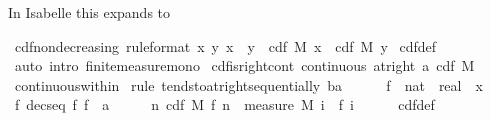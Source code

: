 \documentclass{article}
\theoremstyle{definition}
\begin{document}
In Isabelle this expands to

\medskip

\begin{isabellebody}
\isamarkupfalse%
\ cdf{\isacharunderscore}nondecreasing\ {\isacharbrackleft}rule{\isacharunderscore}format{\isacharbrackright}{\isacharcolon}\ {\isachardoublequoteopen}{\isacharparenleft}{\isasymforall}x\ y{\isachardot}\ x\ {\isasymle}\ y\ {\isasymlongrightarrow}\ cdf\ M\ x\ {\isasymle}\ cdf\ M\ y{\isacharparenright}{\isachardoublequoteclose}\isanewline
{}\isamarkupfalse%
\ cdf{\isacharunderscore}def\ \isamarkupfalse%
\ {\isacharparenleft}auto\ intro{\isacharbang}{\isacharcolon}\ finite{\isacharunderscore}measure{\isacharunderscore}mono{\isacharparenright}%
\isanewline\isanewline%
\isamarkupfalse%
\ cdf{\isacharunderscore}is{\isacharunderscore}right{\isacharunderscore}cont{\isacharcolon}\ {\isachardoublequoteopen}continuous\ {\isacharparenleft}at{\isacharunderscore}right\ a{\isacharparenright}\ {\isacharparenleft}cdf\ M{\isacharparenright}{\isachardoublequoteclose}\isanewline
{}\isamarkupfalse%
\ continuous{\isacharunderscore}within\isanewline
{}\isamarkupfalse%
\ {\isacharparenleft}rule\ tendsto{\isacharunderscore}at{\isacharunderscore}right{\isacharunderscore}sequentially{\isacharbrackleft}\ b{\isacharequal}{\isachardoublequoteopen}a\ {\isacharplus}\ {}{\isachardoublequoteclose}{\isacharbrackright}{\isacharparenright}\isanewline
\ \ \isamarkupfalse%
\ f\ {\isacharcolon}{\isacharcolon}\ {\isachardoublequoteopen}nat\ {\isasymRightarrow}\ real{\isachardoublequoteclose}\ \ x\ \isamarkupfalse%
\ f{\isacharcolon}\ {\isachardoublequoteopen}decseq\ f{\isachardoublequoteclose}\ {\isachardoublequoteopen}f\ {\isacharminus}{\isacharminus}{\isacharminus}{\isacharminus}{\isachargreater}\ a{\isachardoublequoteclose}\isanewline
\ \ \isamarkupfalse%
\ \isamarkupfalse%
\ {\isachardoublequoteopen}{\isacharparenleft}{\isasymlambda}n{\isachardot}\ cdf\ M\ {\isacharparenleft}f\ n{\isacharparenright}{\isacharparenright}\ {\isacharminus}{\isacharminus}{\isacharminus}{\isacharminus}{\isachargreater}\ measure\ M\ {\isacharparenleft}{\isasymInter}i{\isachardot}\ {\isacharbraceleft}{\isachardot}{\isachardot}\ f\ i{\isacharbraceright}{\isacharparenright}{\isachardoublequoteclose}\isanewline
\ \ \ \ \isamarkupfalse%
\ cdf{\isacharunderscore}def\ \isanewline
\ \ \ \ \isamarkupfalse%

\end{isabellebody}
\end{document}
